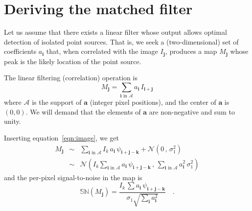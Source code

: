 \documentclass[11pt,letterpaper,linenumbers]{aastex7}
\newcommand{\equationname}{equation}
\newcommand{\eqnref}[1]{\mbox{\equationname~\ref{#1}}}
\newcommand{\drawnfrom}{\sim}
\newcommand{\gaussianN}{\mathcal{N}}
\newcommand{\gaussx}[2]{\gaussianN\!\left(#1 \, , \, #2\right)}
\newcommand{\psf}{\psi}
\newcommand{\psfat}[1]{\psf_{#1}}
\newcommand{\signoise}{[S/N]}
\newcommand{\snr}[1]{\mathbb{SN}(#1)}
\renewcommand{\vec}[1]{\boldsymbol{#1}}
\newcommand{\avec}{\vec{a}}
\newcommand{\ivec}{\vec{i}}
\newcommand{\jvec}{\vec{j}}
\newcommand{\kvec}{\vec{k}}
\newcommand{\coord}[2]{(#1, #2)}
\newcommand{\iina}{\ivec \,\, \mathrm{in} \,\, \mathcal{A}}
\begin{document}
%

{}

\appendix

\section{Deriving the matched filter}
\label{app:lindet}

Let us assume that there exists a linear filter whose output allows
optimal detection of isolated point sources.  That is, we seek a
(two-dimensional) set of coefficients $a_{\ivec}$ that, when
correlated with the image $I_{\jvec}$, produces a map $M_{\jvec}$
whose peak is the likely location of the point source.


The linear filtering (correlation) operation is
\begin{equation}
M_{\jvec} = \sum_{\iina} a_{\ivec} \, I_{\ivec + \jvec}
\label{eq:detmap1}
\end{equation}
where $\mathcal{A}$ is the support of $\avec$ (integer pixel
positions), and the center of $\avec$ is $\coord{0}{0}$.  We will
demand that the elements of $\avec$ are non-negative and sum to unity.

Inserting \eqnref{eqn:image}, we get
\begin{eqnarray}
M_{\jvec} &\drawnfrom& \sum_{\iina}
  I_k \, a_{\ivec} \, \psfat{\ivec + \jvec - \kvec} + \gaussx{0}{\sigma_1^2}
  \\
&\drawnfrom& \gaussx{ I_k \sum_{\iina} a_{\ivec} \, \psfat{\ivec + \jvec - \kvec}}%
    {\sum_{\iina} a_{\ivec}^2 \, \sigma_1^2}
\end{eqnarray}
and the per-pixel signal-to-noise in the map is
\begin{equation}
  \snr{M_{\jvec}} = \frac{I_k \, \sum a_{\ivec} \, \psfat{\ivec + \jvec - \kvec}}{\sigma_1 \sqrt{\sum_{\ivec} a_{\ivec}^2}} \quad .
  \label{eq:detmapsn1}
\end{equation}
\end{document}
